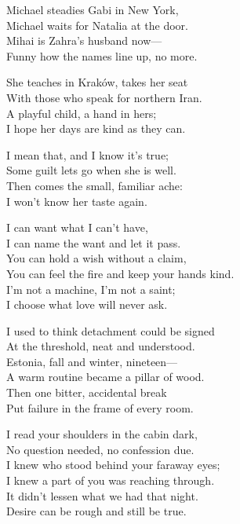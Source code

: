 \begin{lyrics}
Michael steadies Gabi in New York,\\
Michael waits for Natalia at the door.\\
Mihai is Zahra’s husband now—\\
Funny how the names line up, no more.

She teaches in Kraków, takes her seat\\
With those who speak for northern Iran.\\
A playful child, a hand in hers;\\
I hope her days are kind as they can.

I mean that, and I know it’s true;\\
Some guilt lets go when she is well.\\
Then comes the small, familiar ache:\\
I won’t know her taste again.

I can want what I can’t have,\\
I can name the want and let it pass.\\
You can hold a wish without a claim,\\
You can feel the fire and keep your hands kind.\\
I’m not a machine, I’m not a saint;\\
I choose what love will never ask.

I used to think detachment could be signed\\
At the threshold, neat and understood.\\
Estonia, fall and winter, nineteen—\\
A warm routine became a pillar of wood.\\
Then one bitter, accidental break\\
Put failure in the frame of every room.

I read your shoulders in the cabin dark,\\
No question needed, no confession due.\\
I knew who stood behind your faraway eyes;\\
I knew a part of you was reaching through.\\
It didn’t lessen what we had that night.\\
Desire can be rough and still be true.


\end{lyrics}
